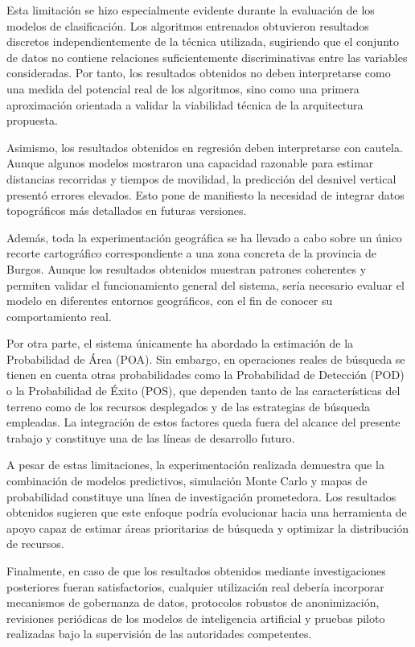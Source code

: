 Esta limitación se hizo especialmente evidente durante la evaluación de los modelos de clasificación. Los algoritmos entrenados obtuvieron resultados discretos independientemente de la técnica utilizada, sugiriendo que el conjunto de datos no contiene relaciones suficientemente discriminativas entre las variables consideradas. Por tanto, los resultados obtenidos no deben interpretarse como una medida del potencial real de los algoritmos, sino como una primera aproximación orientada a validar la viabilidad técnica de la arquitectura propuesta.

Asimismo, los resultados obtenidos en regresión deben interpretarse con cautela. Aunque algunos modelos mostraron una capacidad razonable para estimar distancias recorridas y tiempos de movilidad, la predicción del desnivel vertical presentó errores elevados. Esto pone de manifiesto la necesidad de integrar datos topográficos más detallados en futuras versiones.

Además, toda la experimentación geográfica se ha llevado a cabo sobre un único recorte cartográfico correspondiente a una zona concreta de la provincia de Burgos. Aunque los resultados obtenidos muestran patrones coherentes y permiten validar el funcionamiento general del sistema, sería necesario evaluar el modelo en diferentes entornos geográficos, con el fin de conocer su comportamiento real.

Por otra parte, el sistema únicamente ha abordado la estimación de la Probabilidad de Área (POA). Sin embargo, en operaciones reales de búsqueda se tienen en cuenta otras probabilidades como la Probabilidad de Detección (POD) o la Probabilidad de Éxito (POS), que dependen tanto de las características del terreno como de los recursos desplegados y de las estrategias de búsqueda empleadas. La integración de estos factores queda fuera del alcance del presente trabajo y constituye una de las líneas de desarrollo futuro.

A pesar de estas limitaciones, la experimentación realizada demuestra que la combinación de modelos predictivos, simulación Monte Carlo y mapas de probabilidad constituye una línea de investigación prometedora. Los resultados obtenidos sugieren que este enfoque podría evolucionar hacia una herramienta de apoyo capaz de estimar áreas prioritarias de búsqueda y optimizar la distribución de recursos.

Finalmente, en caso de que los resultados obtenidos mediante investigaciones posteriores fueran satisfactorios, cualquier utilización real debería incorporar mecanismos de gobernanza de datos, protocolos robustos de anonimización, revisiones periódicas de los modelos de inteligencia artificial y pruebas piloto realizadas bajo la supervisión de las autoridades competentes. 
